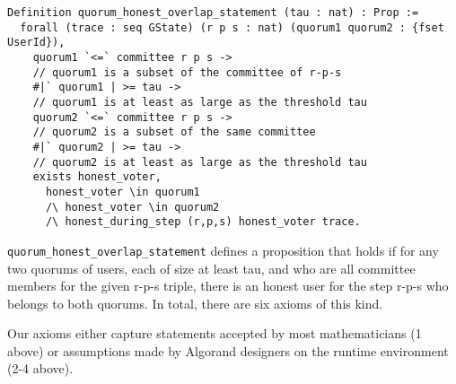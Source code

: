 \begin{enumerate}
\begin{lstlisting}[language=Coq]
Definition quorum_honest_overlap_statement (tau : nat) : Prop :=
  forall (trace : seq GState) (r p s : nat) (quorum1 quorum2 : {fset UserId}),
    quorum1 `<=` committee r p s ->		
    // quorum1 is a subset of the committee of r-p-s
    #|` quorum1 | >= tau ->					
    // quorum1 is at least as large as the threshold tau
    quorum2 `<=` committee r p s ->		
    // quorum2 is a subset of the same committee 
    #|` quorum2 | >= tau ->					
    // quorum2 is at least as large as the threshold tau
    exists honest_voter,
      honest_voter \in quorum1
      /\ honest_voter \in quorum2
      /\ honest_during_step (r,p,s) honest_voter trace.
\end{lstlisting}

\lstinline{quorum_honest_overlap_statement} defines a proposition that holds if for any two quorums of users, each of size at least tau, and who are all committee members for the given r-p-s triple, there is an honest user for the step r-p-s who belongs to both quorums. In total, there are six axioms of this kind.
\end{enumerate}

Our axioms either capture statements accepted by most mathematicians (1 above) or assumptions made by Algorand designers on the runtime environment (2-4 above).

